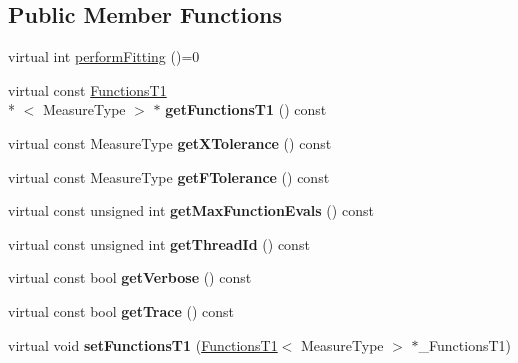 \subsection*{Public Member Functions}
\begin{DoxyCompactItemize}
\item 
virtual int \hyperlink{class_ox_1_1_fitter_a8f240f0da86d06b339ab2747e87f21b9}{perform\-Fitting} ()=0
\item 
\hypertarget{class_ox_1_1_fitter_a859dc8c25c99b37f47d41e086b97c897}{virtual const \hyperlink{class_ox_1_1_functions_t1}{Functions\-T1}\\*
$<$ Measure\-Type $>$ $\ast$ {\bfseries get\-Functions\-T1} () const }\label{class_ox_1_1_fitter_a859dc8c25c99b37f47d41e086b97c897}

\item 
\hypertarget{class_ox_1_1_fitter_a21f92547f664c9b6f3fa8da4c7d16965}{virtual const Measure\-Type {\bfseries get\-X\-Tolerance} () const }\label{class_ox_1_1_fitter_a21f92547f664c9b6f3fa8da4c7d16965}

\item 
\hypertarget{class_ox_1_1_fitter_ac62bf275718aafc95b5e49d0aa9fc1ef}{virtual const Measure\-Type {\bfseries get\-F\-Tolerance} () const }\label{class_ox_1_1_fitter_ac62bf275718aafc95b5e49d0aa9fc1ef}

\item 
\hypertarget{class_ox_1_1_fitter_a04f36e075f86c6a89df833d17b9f029d}{virtual const unsigned int {\bfseries get\-Max\-Function\-Evals} () const }\label{class_ox_1_1_fitter_a04f36e075f86c6a89df833d17b9f029d}

\item 
\hypertarget{class_ox_1_1_fitter_a68e317f1c05ea2aa24f9d4803ee19215}{virtual const unsigned int {\bfseries get\-Thread\-Id} () const }\label{class_ox_1_1_fitter_a68e317f1c05ea2aa24f9d4803ee19215}

\item 
\hypertarget{class_ox_1_1_fitter_afeba16a2218db1f3fc646e2dde75f386}{virtual const bool {\bfseries get\-Verbose} () const }\label{class_ox_1_1_fitter_afeba16a2218db1f3fc646e2dde75f386}

\item 
\hypertarget{class_ox_1_1_fitter_a9c3401372be5c8698464deb05c0f5533}{virtual const bool {\bfseries get\-Trace} () const }\label{class_ox_1_1_fitter_a9c3401372be5c8698464deb05c0f5533}

\item 
\hypertarget{class_ox_1_1_fitter_acf5be118a916c6b52034191f1bdaf790}{virtual void {\bfseries set\-Functions\-T1} (\hyperlink{class_ox_1_1_functions_t1}{Functions\-T1}$<$ Measure\-Type $>$ $\ast$\-\_\-\-Functions\-T1)}\label{class_ox_1_1_fitter_acf5be118a916c6b52034191f1bdaf790}


\end{DoxyCompactItemize}
